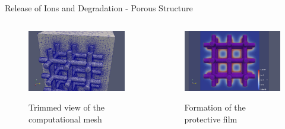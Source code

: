 \documentclass[11pt,t]{beamer}
\begin{document}
\begin{frame}[fragile]{Release of Ions and Degradation - Porous Structure}

	\begin{columns}[t]
		\begin{column}{.50\textwidth}
			\begin{figure}
			\centering
			\includegraphics[width=\textwidth]{porous_mesh}
			
			\footnotesize	Trimmed view of the computational mesh
			\end{figure}
		\end{column}
		\begin{column}{.50\textwidth}

			\begin{figure}
			\centering
			\includegraphics[width=\textwidth]{porous_film}
			
			\footnotesize	Formation of the protective film
			\end{figure}
		\end{column}
	\end{columns}



\end{frame}
\end{document}
